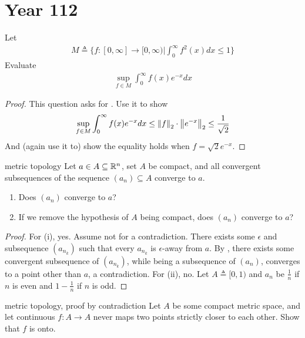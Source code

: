 \documentclass{report}
\begin{document}
\section{Year 112}
\begin{question}{}{}
Let 
\begin{align*}
M\triangleq \Bigg\{f:[0,\infty]\rightarrow [0,\infty)\Bigg| \int_0^{\infty}f^2(x)dx \leq 1\Bigg\}
\end{align*}
Evaluate 
\begin{align}
\label{fM}
\sup_{f\in M}\int_0^{\infty}f(x)e^{-x}dx
\end{align}
\end{question}
\begin{proof}
This question asks for . Use it to show 
\begin{align*}
\sup_{f \in M}\int_0^{\infty}f(x) e^{-x}dx \leq \left\| f \right\|_2 \cdot  \left\| e^{-x} \right\|_2 \leq  \frac{1}{\sqrt{2}} 
\end{align*}
And (again use it to) show the equality holds when $f= \sqrt{2}e^{-x}$.  
\end{proof}
\begin{question}{metric topology}{}
Let $a \in A \subseteq \mathbb{R}^n$, set $A$ be compact, and all convergent subsequences of the sequence $(a_n)\subseteq A$ converge to $a$. 
 \begin{enumerate}[label=(\roman*)]
   \item Does $(a_n)$ converge to  $a$? 
   \item If we remove the hypothesis of $A$ being compact, does  $(a_n)$ converge to $a$?  
\end{enumerate}
\end{question}
\begin{proof}
For (i), yes. Assume not for a contradiction. There exists some $\epsilon $ and subsequence $(a_{n_k})$ such that every $a_{n_k}$ is $\epsilon $-away from $a$. By , there exists some convergent subsequence of $(a_{n_k})$, while being a subsequence of $(a_n)$, converges to a point other than $a$, a contradiction. For (ii), no. Let $A\triangleq [0,1)$ and $a_n$ be  $\frac{1}{n}$ if $n$ is even and  $1-\frac{1}{n}$ if $n$ is odd. 
\end{proof}
\begin{question}{metric topology, proof by contradiction}{}
Let  $A$ be some compact metric space, and let continuous $f:A\rightarrow A$ never maps two points strictly closer to each other. Show that $f$ is onto.    
\end{question}
\end{document}
